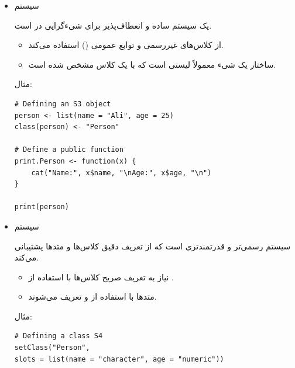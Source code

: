 \documentclass[11pt, a4paper, oneside]{book}
\begin{document}
		 	\begin{itemize}
		 		
		 		\item {\large سیستم } \par
		 		
		 		یک سیستم ساده و انعطاف‌پذیر برای شیءگرایی در  است.
		 		
		 		\begin{itemize}
		 			
		 			\item 
		 			از کلاس‌های غیررسمی و توابع عمومی () استفاده می‌کند.
		 			
		 			\item
		 			ساختار یک شیء  معمولاً لیستی است که با یک کلاس مشخص شده است.
		 			
		 		\end{itemize}
		 		
		 		مثال:
		 		
		 		\begin{latin}
		 			\begin{lstlisting}[caption={\lr{S3 OOP}}] 
# Defining an S3 object
person <- list(name = "Ali", age = 25)
class(person) <- "Person"

# Define a public function
print.Person <- function(x) {
	cat("Name:", x$name, "\nAge:", x$age, "\n")
}

print(person)

		 			\end{lstlisting}
		 		\end{latin}
		 		
		 		
		 		\item {\large سیستم } \par
		 		سیستم رسمی‌تر و قدرتمندتری است که از تعریف دقیق کلاس‌ها و متدها پشتیبانی می‌کند.
		 		
		 		\begin{itemize}
		 			
		 			\item نیاز به تعریف صریح کلاس‌ها با استفاده از .
		 			
		 			\item متدها با استفاده از  و  تعریف می‌شوند.
		 			
		 		\end{itemize}
		 		
		 		مثال:
		 		
		 		\begin{latin}
		 			\begin{lstlisting}[caption={\lr{S3 OOP}}] 
# Defining a class S4
setClass("Person",
slots = list(name = "character", age = "numeric"))


\end{lstlisting}
\end{latin}
\end{itemize}
\end{document}

